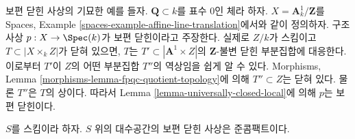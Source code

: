 \begin{example}
\label{example-strange-universally-closed}
보편 닫힌 사상의 기묘한 예를 들자.
$\mathbf{Q} \subset k$를 표수 0인 체라 하자.
$X = \mathbf{A}^1_k/\mathbf{Z}$를 Spaces, Example
\ref{spaces-example-affine-line-translation}에서와 같이 정의하자.
구조사상 $p : X \to \Spec(k)$가 보편 닫힌이라고 주장한다.
실제로 $Z/k$가 스킴이고 $T \subset |X \times_k Z|$가 닫혀 있으면,
$T$는 $T' \subset |\mathbf{A}^1 \times Z|$의
$\mathbf{Z}$-불변 닫힌 부분집합에 대응한다.
이로부터 $T'$이 $Z$의 어떤 부분집합 $T''$의 역상임을 쉽게 알 수 있다.
Morphisms, Lemma \ref{morphisms-lemma-fpqc-quotient-topology}에 의해
$T'' \subset Z$는 닫혀 있다. 물론 $T''$은 $T$의 상이다.
따라서 Lemma \ref{lemma-universally-closed-local}에 의해
$p$는 보편 닫힌이다.
\end{example}

\begin{lemma}
\label{lemma-universally-closed-quasi-compact}
$S$를 스킴이라 하자.
$S$ 위의 대수공간의 보편 닫힌 사상은 준콤팩트이다.
\end{lemma}


